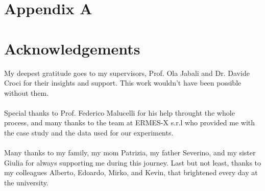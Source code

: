 \documentclass{Configuration_Files/PoliMi3i_thesis}
\theoremstyle{colored}
\theoremstyle{colored}
\begin{document}
    \chapter{Appendix A}
    
    
    
    


    \listoffigures

    \listoftables


    \chapter*{Acknowledgements}
    My deepest gratitude goes to my supervisors, Prof. Ola Jabali and Dr. Davide Croci for their insights and support. This work wouldn't have been possible without them.\\
    \\
    Special thanks to Prof. Federico Malucelli for his help throught the whole process, and many thanks to the team at ERMES-X s.r.l who provided me with the case study and the data used for our experiments.\\
    \\
    Many thanks to my family, my mom Patrizia, my father Severino, and my sister Giulia for always supporting me during this journey.
    Last but not least, thanks to my colleagues Alberto, Edoardo, Mirko, and Kevin, that brightened every day at the university.
    \cleardoublepage
\end{document}
